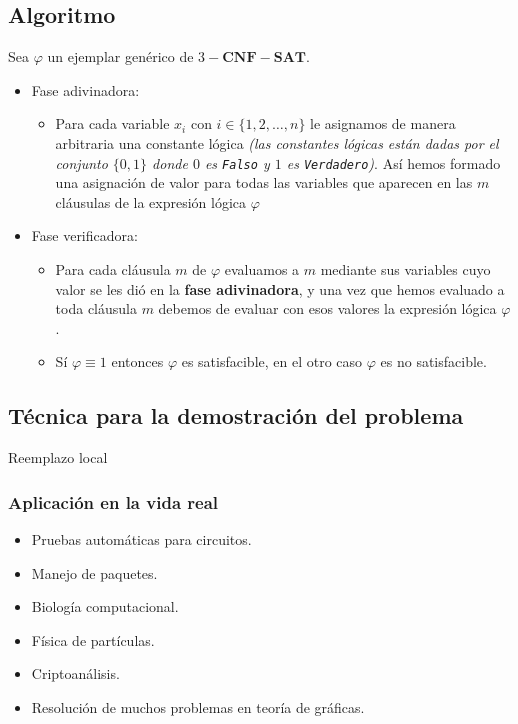 \documentclass[a4paper]{article}
\begin{document}
\subsection{Algoritmo}
Sea \(\varphi\) un ejemplar genérico de \(3-\mathbf{CNF}-\mathbf{SAT}\).
\begin{itemize}
    \item Fase adivinadora:
    \begin{itemize}
        \item Para cada variable \(x_{i}\) con \(i \in \{1, 2, \dotsc, n\}\) le asignamos de manera arbitraria una constante lógica 
        \textit{(las constantes lógicas están dadas por el conjunto \(\{0, 1\}\) donde \(0\) es \texttt{Falso} y \(1\) es \texttt{Verdadero})}.
        Así hemos formado una asignación de valor para todas las variables que aparecen en las \(m\) cláusulas de la expresión lógica \(\varphi\)
    \end{itemize}
    \item Fase verificadora:
    \begin{itemize}
        \item Para cada cláusula \(m\) de \(\varphi\) evaluamos a \(m\) mediante sus variables cuyo valor se les dió en la \textbf{fase adivinadora},
        y una vez que hemos evaluado a toda cláusula \(m\) debemos de evaluar con esos valores la expresión lógica \(\varphi\).
        \item Sí \(\varphi \equiv 1\) entonces \(\varphi\) es satisfacible, en el otro caso \(\varphi\) es no satisfacible.
    \end{itemize}
\end{itemize}
\subsection{Técnica para la demostración del problema}
\noindent
Reemplazo local
\subsubsection{Aplicación en la vida real}
\begin{itemize}
    \item Pruebas automáticas para circuitos.
    \item Manejo de paquetes.
    \item Biología computacional.
    \item Física de partículas.
    \item Criptoanálisis.
    \item Resolución de muchos problemas en teoría de gráficas.
\end{itemize}
\end{document}
